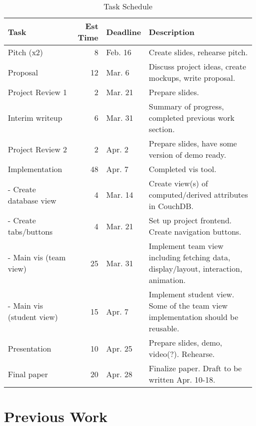 \documentclass[preprint,journal]{vgtc}       %
\begin{document}
\begin{table*}[t]
  \caption{Task Schedule}
  \label{tab:schedule}
  \centering
  \begin{tabular*}{\textwidth}{lrll}%
    \hline
    \textbf{Task} & \textbf{Est Time} & \textbf{Deadline} & \textbf{Description} \\
    \hline
    Pitch (x2)                       &  8 & Feb. 16  & Create slides, rehearse pitch. \\
    Proposal                         & 12 & Mar. 6   & Discuss project ideas, create mockups, write proposal. \\
    Project Review 1                 &  2 & Mar. 21  & Prepare slides. \\
    Interim writeup                  &  6 & Mar. 31  & Summary of progress, completed previous work section. \\
    Project Review 2                 &  2 & Apr. 2   & Prepare slides, have some version of demo ready. \\
    Implementation                   & 48 & Apr. 7   & Completed vis tool. \\
     - Create database view          &  4 & Mar. 14  & Create view(s) of computed/derived attributes in CouchDB. \\
     - Create tabs/buttons           &  4 & Mar. 21  & Set up project frontend. Create navigation buttons. \\
     - Main vis (team view)          & 25 & Mar. 31  & Implement team view including fetching data, display/layout,  interaction, animation. \\
     - Main vis (student view)       & 15 & Apr. 7   & Implement student view. Some of the team view implementation should be reusable. \\
    Presentation                     & 10 & Apr. 25  & Prepare slides, demo, video(?). Rehearse. \\
    Final paper                      & 20 & Apr. 28  & Finalize paper. Draft to be written Apr. 10-18. \\
    \hline
  \end{tabular*}
\end{table*}

\section{Previous Work}




%
%
%
%


\end{document}
